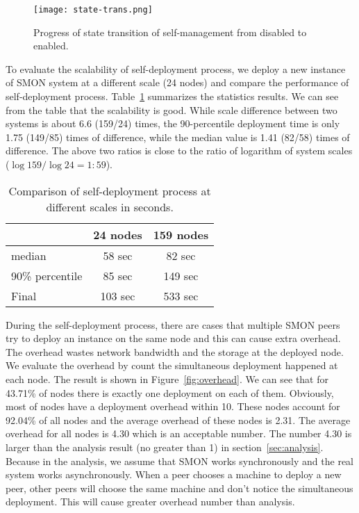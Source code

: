 \begin{figure}
\centering
\texttt{[image: state-trans.png]}
\caption{Progress of state transition of self-management from disabled to
enabled.}
\label{fig:state-transition}
\end{figure}


To evaluate the scalability of self-deployment process, we deploy
a new instance of SMON system at a different scale (24 nodes) and
compare the performance of self-deployment process.
Table~\ref{tbl:scalability} summarizes the statistics results.
We can see from the table that the scalability is good.
While scale difference between two systems is about 6.6
(159/24) times, the
90-percentile deployment time is only 1.75 (149/85) times of
difference, while the median value is 1.41 (82/58) times of
difference. The above two ratios is close to the ratio of
logarithm of system scales ($\log 159 / \log 24 = 1:59$).

\begin{table}
\centering
\begin{tabular}{|l|c|c|}
\hline
  & 24 nodes & 159 nodes\\
\hline
median & 58 sec & 82 sec \\
\hline
90\% percentile & 85 sec & 149 sec\\
\hline
Final & 103 sec & 533 sec\\
\hline
\end{tabular}
\caption{Comparison of self-deployment process at different
scales in seconds.}
\label{tbl:scalability}
\end{table}

During the self-deployment process, there are cases that
multiple SMON peers try to deploy an instance on the same
node and this can cause extra overhead. The overhead wastes
network bandwidth and the storage at the deployed node. We
evaluate the overhead by count the simultaneous deployment
happened at each node. The result is shown in
Figure~\ref{fig:overhead}. We can see that for 43.71\% of
nodes there is exactly one deployment on each of them.
Obviously, most of nodes have a deployment overhead within
10. These nodes account for 92.04\% of all nodes and the
average overhead of these nodes is 2.31. The average
overhead for all nodes is 4.30 which is an acceptable
number. The number 4.30 is larger than the analysis result
(no greater than 1) in section~\ref{sec:analysis}. Because
in the analysis, we assume that SMON works synchronously and
the real system works asynchronously. When a peer chooses a
machine to deploy a new peer, other peers will choose the
same machine and don't notice the simultaneous deployment.
This will cause greater overhead number than analysis.


